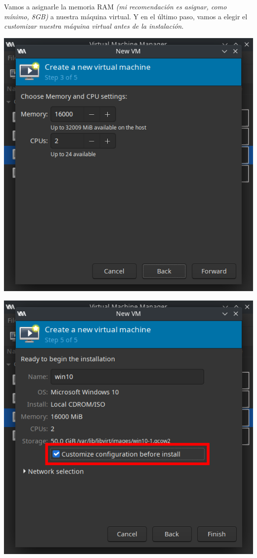 \documentclass[12pt]{article}
\begin{document}
Vamos a asignarle la memoria RAM \emph{(mi recomendación es asignar, como mínimo, 8GB)} a nuestra máquina virtual. Y en el último paso, vamos a elegir el \emph{customizar nuestra máquina virtual antes de la instalación}.

\begin{multicols}{2}
\begin{minipage}[t]{\linewidth}%
\vspace{0pt}
\includegraphics[width=\textwidth]{assets/vmm_memory_setup.png}
\end{minipage}
\begin{minipage}[t]{\linewidth}%
\vspace{0pt}
\includegraphics[width=\textwidth]{assets/vmm_name.png}
\end{minipage}
\end{multicols}
\end{document}
